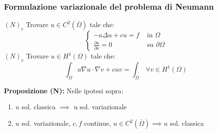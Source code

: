 \subsubsection{Formulazione variazionale del problema di Neumann}
$(N)_c$ Trovare $u\in C^2(\overline\Omega)$ tale che:
\[\begin{cases}
	-a\Delta u+cu=f&\text{ in }\Omega
	\\\frac{\partial u}{\partial \nu} =0&\text{ su }\partial \Omega
\end{cases}\]
$(N)_v$ Trovare $u\in H^1(\Omega)$ tale che:
\[\int_{\Omega}^{} a\nabla u\cdot \nabla v+cuv=\int_{\Omega}^{} \ \forall v\in H^1(\Omega)\]
\begin{tcolorbox}
	\textbf{Proposizione (N):} Nelle ipotesi sopra:
	\begin{enumerate}
		\item $u$ sol. classica $\implies $ u sol. variazionale
		\item $u$ sol. variazionale, $c,f$ continue, $u\in C^2(\overline\Omega)\implies u$ sol. classica
	\end{enumerate}
\end{tcolorbox}
